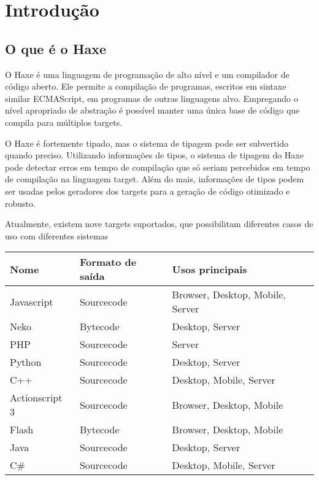 \chapter{Introdução}
\label{introduction}

\section{O que é o Haxe}
\label{introduction-what-is-haxe}

O Haxe é uma linguagem de programação de alto nível e um compilador de código aberto. Ele permite a compilação de programas, escritos em sintaxe similar ECMAScript, em programas de outras linguagens alvo. Empregando o nível apropriado de abstração é possível manter uma única base de código que compila para múltiplos targets.

O Haxe é fortemente tipado, mas o sistema de tipagem pode ser subvertido quando preciso. Utilizando informações de tipos, o sistema de tipagem do Haxe pode detectar erros em tempo de compilação que só seriam percebidos em tempo de compilação na linguagem target. Além do mais, informações de tipos podem ser usadas pelos geradores dos targets para a geração de código otimizado e robusto.

Atualmente, existem nove targets suportados, que possibilitam diferentes casos de uso com diferentes sistemas 

\begin{center}
\begin{tabular}{| l | l | l |}
	\hline
	Nome & Formato de saída & Usos principais \\ \hline
	Javascript & Sourcecode & Browser, Desktop, Mobile, Server \\
	Neko & Bytecode & Desktop, Server \\
	PHP & Sourcecode & Server \\
	Python & Sourcecode & Desktop, Server \\
	C++ & Sourcecode & Desktop, Mobile, Server \\
	Actionscript 3 & Sourcecode & Browser, Desktop, Mobile \\
	Flash & Bytecode & Browser, Desktop, Mobile \\ 
	Java & Sourcecode & Desktop, Server \\
	C\# & Sourcecode & Desktop, Mobile, Server \\ \hline
\end{tabular}
\end{center}

